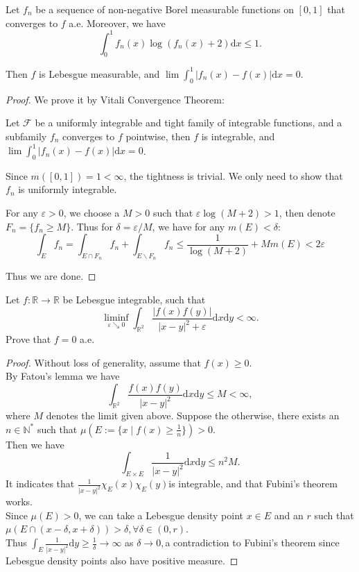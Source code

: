 \begin{problem}
Let $ f_{n} $ be a sequence of non-negative Borel measurable functions on $ [0,1] $ that converges to $ f $ a.e. Moreover, we have
$$
	\int_0^1{f_n( x ) \log ( f_n( x ) +2 ) \mathrm{d} x}\le 1.
$$

Then $ f $ is Lebesgue measurable, and $
	\lim \int_0^1{|f_n( x ) -f( x ) |\mathrm{d} x}=0
$.
\end{problem}

\begin{proof}
	We prove it by Vitali Convergence Theorem:
	\begin{lemma*}
		Let $ \mathcal{F}  $ be a uniformly integrable and tight family of integrable functions, and a subfamily $ f_{n} $ converges to $ f $ pointwise, then $ f $ is integrable, and $
			\lim \int_0^1{|f_n( x ) -f( x ) |\mathrm{d} x}=0
		$.
	\end{lemma*}

	Since $ m([0,1])=1<\infty $, the tightness is trivial. We only need to show that $ f_{n} $ is uniformly integrable.

	For any $ \varepsilon>0 $, we choose a $ M>0 $ such that $
		\varepsilon \log \left( M+2 \right)>1
	$, then denote $ F_{n}=\{f_{n}\ge M\} $. Thus for $ \delta=\varepsilon/M $, we have for any $ m(E)<\delta $:
	$$
		\int_E^{}{f_n}=\int_{E\cap F_n}^{}{f_n}+\int_{E\backslash F_n}^{}{f_n}\le \frac{1}{\log \left( M+2 \right)}+Mm( E ) <2\varepsilon
	$$

	Thus we are done.
\end{proof}

\begin{problem}
Let $ f\colon\mathbb{R} \to \mathbb{R}  $ be Lebesgue integrable, such that
$$
\liminf_{\varepsilon \searrow 0}\int_{\mathbb{R}^2}^{}{\frac{|f(x)f(y) |}{|x-y|^2+\varepsilon}\mathrm{d} x\mathrm{d} y}<\infty.
$$
Prove that $f=0$ a.e.
\end{problem}

\begin{proof}
	Without loss of generality, assume that $f(x)\ge0.$\\
    By Fatou's lemma we have $$\int_{\mathbb{R}^2} \frac{f(x)f(y)}{|x-y|^2}\mathrm{d} x\mathrm{d} y \le M< \infty,$$
    where $M$ denotes the limit given above. Suppose the otherwise, there exists an $n\in \mathbb{N}^*$ such that $\mu(E:=\{x\mid f(x)\ge \frac{1}{n}\})>0$.\\  
    Then we have $$\int_{E\times E}\frac{1}{|x-y|^2} \mathrm{d} x\mathrm{d} y\le n^2M.$$
    It indicates that $\frac{1}{|x-y|^2}\chi_E(x)\chi_E(y)$is integrable, and that Fubini's theorem works.\\
    Since $\mu(E)>0$, we can take a Lebesgue density point $x\in E$ and an $r$ such that $\mu(E\cap (x-\delta,x+\delta))>\delta ,\forall \delta \in (0,r).$\\
    Thus $\int_E \frac{1}{|x-y|^2} \mathrm{d} y\ge \frac{1}{\delta}\to \infty$ as $\delta \to 0,$a contradiction to Fubini's theorem since Lebesgue density points also have positive measure.


\end{proof}

